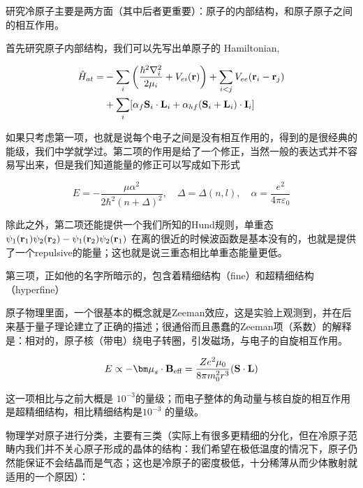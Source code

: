 
研究冷原子主要是两方面（其中后者更重要）：原子的内部结构，和原子原子之间的相互作用。

首先研究原子内部结构，我们可以先写出单原子的 Hamiltonian,

\begin{equation}
\begin{split}
\hat{H}_{at}=&-\sum_i\left(\frac{\hbar^2\nabla_i^2}{2\mu_i}+V_{ei}({\bf r})\right) + \sum_{i<j}V_{ee}({\bf r}_i-{\bf r}_j)\\
&+\sum_i [\alpha_f {\bf S}_i\cdot{\bf L}_i+\alpha_{hf}({\bf S}_i+{\bf L}_i)\cdot {\bf I}_i]
\end{split}
\end{equation}

如果只考虑第一项，也就是说每个电子之间是没有相互作用的，得到的是很经典的能级，我们中学就学过。第二项的作用是给了一个修正，当然一般的表达式并不容易写出来，但是我们知道能量的修正可以写成如下形式

\begin{equation}
E = -\frac{\mu\alpha^2}{2\hbar^2(n+\Delta)^2},\quad \Delta = \Delta(n,l),\quad \alpha = \frac{e^2}{4\pi\varepsilon_0}
\end{equation}

除此之外，第二项还能提供一个我们所知的Hund规则，单重态 $\psi_1({\bf r}_1)\psi_2({\bf r}_2)-\psi_1({\bf r}_2)\psi_2({\bf r}_1)$ 在离的很近的时候波函数是基本没有的，也就是提供了一个repulsive的能量；这也就是说三重态相比单重态能量更低。

第三项，正如他的名字所暗示的，包含着精细结构（fine）和超精细结构（hyperfine）

原子物理里面，一个很基本的概念就是Zeeman效应，这是实验上观测到，并在后来基于量子理论建立了正确的描述；很通俗而且愚蠢的Zeeman项（系数）的解释是：相对的，原子核（带电）绕电子转圈，引发磁场，与电子的自旋相互作用。

\begin{equation}
E\propto -{\bm\mu}_s\cdot{\bf B}_{\text{eff}}=\frac{Ze^2\mu_0}{8\pi m_0^2 r^3}({\bf S\cdot L})
\end{equation}

这一项相比与之前大概是 $10^{-3}$的量级；而电子整体的角动量与核自旋的相互作用是超精细结构，相比精细结构是$10^{-3}$ 的量级。

物理学对原子进行分类，主要有三类（实际上有很多更精细的分化，但在冷原子范畴内我们并不关心原子形成的晶体的结构：我们希望在极低温度的情况下，原子仍然能保证不会结晶而是气态；这也是冷原子的密度极低，十分稀薄从而少体散射就适用的一个原因）：

